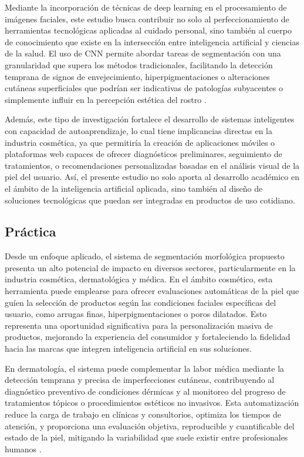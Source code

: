 Mediante la incorporación de técnicas de deep learning en el procesamiento de imágenes faciales, este estudio busca contribuir no solo al perfeccionamiento de herramientas tecnológicas aplicadas al cuidado personal, sino también al cuerpo de conocimiento que existe en la intersección entre inteligencia artificial y ciencias de la salud. El uso de CNN permite abordar tareas de segmentación con una granularidad que supera los métodos tradicionales, facilitando la detección temprana de signos de envejecimiento, hiperpigmentaciones o alteraciones cutáneas superficiales que podrían ser indicativas de patologías subyacentes o simplemente influir en la percepción estética del rostro \parencite{phillips2020, gao2018}.

Además, este tipo de investigación fortalece el desarrollo de sistemas inteligentes con capacidad de autoaprendizaje, lo cual tiene implicancias directas en la industria cosmética, ya que permitiría la creación de aplicaciones móviles o plataformas web capaces de ofrecer diagnósticos preliminares, seguimiento de tratamientos, o recomendaciones personalizadas basadas en el análisis visual de la piel del usuario. Así, el presente estudio no solo aporta al desarrollo académico en el ámbito de la inteligencia artificial aplicada, sino también al diseño de soluciones tecnológicas que puedan ser integradas en productos de uso cotidiano.

\subsection{Práctica}
Desde un enfoque aplicado, el sistema de segmentación morfológica propuesto presenta un alto potencial de impacto en diversos sectores, particularmente en la industria cosmética, dermatológica y médica. En el ámbito cosmético, esta herramienta puede emplearse para ofrecer evaluaciones automáticas de la piel que guíen la selección de productos según las condiciones faciales específicas del usuario, como arrugas finas, hiperpigmentaciones o poros dilatados. Esto representa una oportunidad significativa para la personalización masiva de productos, mejorando la experiencia del consumidor y fortaleciendo la fidelidad hacia las marcas que integren inteligencia artificial en sus soluciones.

En dermatología, el sistema puede complementar la labor médica mediante la detección temprana y precisa de imperfecciones cutáneas, contribuyendo al diagnóstico preventivo de condiciones dérmicas y al monitoreo del progreso de tratamientos tópicos o procedimientos estéticos no invasivos. Esta automatización reduce la carga de trabajo en clínicas y consultorios, optimiza los tiempos de atención, y proporciona una evaluación objetiva, reproducible y cuantificable del estado de la piel, mitigando la variabilidad que suele existir entre profesionales humanos \parencite{huang2020}.

